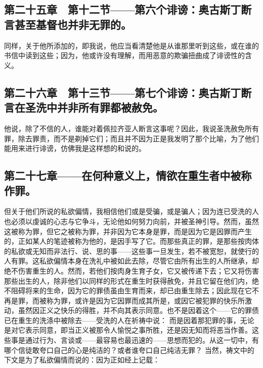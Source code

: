 \subsection{第二十五章　第十二节——第六个诽谤：奥古斯丁断言甚至基督也并非无罪的。}

同样，关于他所添加的，即我说，他应当看清楚他是从谁那里听到这些，或在谁的书信中读到这些；因为，他或许没有理解，而用恶意的欺骗扭曲成了诽谤性的含义。\par


\subsection{第二十六章　第十三节——第七个诽谤：奥古斯丁断言在圣洗中并非所有罪都被赦免。}

他说，除了不信的人，谁能对着佩拉齐亚人断言这事呢？因此，我说圣洗赦免所有罪，除去罪责，而不是剃掉它们；而且并不因为正是我发明了那个比喻，为了他们能用来进行诽谤，仿佛我是这样想的和说的。\par


\subsection{第二十七章——在何种意义上，情欲在重生者中被称作罪。}

但关于他们所说的私欲偏情，我相信他们或是受骗，或是骗人；因为连已受洗的人也必须以虔诚的心志与它争斗，无论他如何努力向前，并被圣神引导。然而，虽然这被称为罪，但它之被称为罪，并非因为它本身是罪，而是因为它是因罪而产生的，正如某人的笔迹被称为他的，是因手写了它。而那些真正的罪，是那些按肉体的私欲或无知而非法行、说、思的事——这些事一旦发生，若不被宽恕，就使行的人有罪。这私欲偏情本身在洗礼中被如此去除，尽管它由所有出生的人所继承，却绝不伤害重生的人。然而，若他们按肉身生育子女，它又被传递下去；它又将伤害那些出生的人，除非他们以同样的形式在重生时获得赦免，并且它留在他们内，绝不阻碍将来的生命，因为它的罪债虽由生育而来，却已由重生除去；因此现在它不再是罪，而被称为罪，或许是因为它因罪而成其所是，或因它被犯罪的快乐所激动，虽然因正义之快乐的得胜，并不向其表示同意。也不是因着这个——它的罪债已在重生的洗涤中被除去——受洗的人在祈祷中说：  而是因着那犯罪的事，无论是对它表示同意，即当正义被那令人愉悦之事所胜，还是因无知而将恶当作善。这些事是通过行为、言谈或——最容易也最迅速的——思想而犯的。从这一切中，有哪个信徒敢夸口自己的心是纯洁的？或者谁夸口自己纯洁无罪？  当然，祷文中的下文是为了私欲偏情而说的：因为正如经上记载： \par

